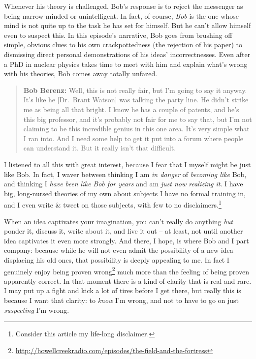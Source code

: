 \documentclass[english,showtrims, 10pt]{memoir}
\renewcommand{\href}[2]{#2\footnote{\raggedright\url{#1}}}
\begin{document}
Whenever his theory is challenged, Bob's response is to reject the
messenger as being narrow-minded or unintelligent. In fact, of course,
\emph{Bob} is the one whose mind is not quite up to the task he has set
for himself. But he can't allow himself even to suspect this. In this
episode's narrative, Bob goes from brushing off simple, obvious clues to
his own crackpottedness (the rejection of his paper) to dismissing
direct personal demonstrations of his ideas' incorrectnesses. Even after
a PhD in nuclear physics takes time to meet with him and explain what's
wrong with his theories, Bob comes away totally unfazed.

\begin{quote}
\textbf{Bob Berenz:} Well, this is not really fair, but I'm going to say
it anyway. It's like he {[}Dr.~Brant Watson{]} was talking the party
line. He didn't strike me as being all that bright. I know he has a
couple of patents, and he's this big professor, and it's probably not
fair for me to say that, but I'm not claiming to be this incredible
genius in this one area. It's very simple what I ran into. And I need
some help to get it put into a forum where people can understand it. But
it really isn't that difficult.
\end{quote}

I listened to all this with great interest, because I fear that I myself
might be just like Bob. In fact, I waver between thinking I am \emph{in
danger} of \emph{becoming like} Bob, and thinking I \emph{have been like
Bob for years} and am \emph{just now realizing it}. I have big,
long-nursed theories of my own about subjects I have no formal training
in, and I even write \& tweet on those subjects, with few to no
disclaimers.\footnote{Consider this article my life-long disclaimer.}

When an idea captivates your imagination, you can't really do anything
\emph{but} ponder it, discuss it, write about it, and live it out -- at
least, not until another idea captivates it even more strongly. And
there, I hope, is where Bob and I part company: because while he will
not even admit the possibility of a new idea displacing his old ones,
that possibility is deeply appealing to me. In fact I
\href{http://howellcreekradio.com/episodes/the-field-and-the-fortress}{genuinely
enjoy being proven wrong} much more than the feeling of being proven
apparently correct. In that moment there is a kind of clarity that is
real and rare. I may put up a fight and kick a lot of tires before I get
there, but really this is because I want that clarity: to \emph{know}
I'm wrong, and not to have to go on just \emph{suspecting} I'm wrong.
\end{document}
